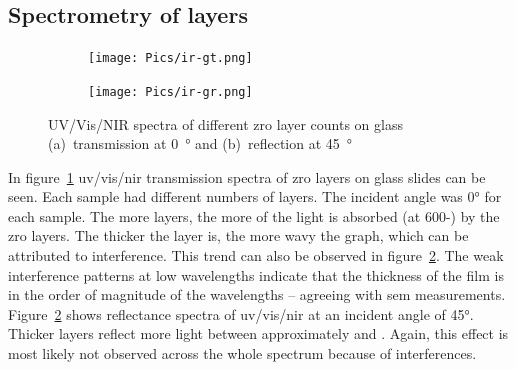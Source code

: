 \subsection{Spectrometry of  layers}
\begin{figure}[htb]
    \centering
    \begin{subfigure}{.49\textwidth}
        \centering
        \texttt{[image: Pics/ir-gt.png]}
		\caption{}%
		\label{fig:ir-gt}
    \end{subfigure}
    \begin{subfigure}{.49\textwidth}
        \centering
        \texttt{[image: Pics/ir-gr.png]}
		\caption{}%
		\label{fig:ir-gr}
    \end{subfigure}
	\label{fig:ir}
	\caption{UV/Vis/NIR spectra of different \gls{zro} layer counts on glass 
	(a)~transmission at \SI{0}{\degree} and (b)~reflection at \SI{45}{\degree} 
	} 
\end{figure}

In figure~\ref{fig:ir-gt} \gls{uv}/\gls{vis}/\gls{nir} transmission spectra of \gls{zro} layers on glass slides can be seen. 
Each sample had different numbers of layers. 
The incident angle was \ang{0} for each sample.
The more layers, the more of the light is absorbed (at 600-) by the \gls{zro} layers. 
The thicker the layer is, the more wavy the graph, which can be attributed to interference\cite{Dumin1967}.
This trend can also be observed in figure~\ref{fig:ir-gr}.
The weak interference patterns at low wavelengths indicate that the thickness of the film is in the order of magnitude of the wavelengths\cite{delimafilho2017film} -- agreeing with \gls{sem} measurements. 
%
Figure~\ref{fig:ir-gr} shows reflectance spectra of \gls{uv}/\gls{vis}/\gls{nir} at an incident angle of \ang{45}. 
Thicker layers reflect more light between approximately  and . 
Again, this effect is most likely not observed across the whole spectrum because of interferences. 


